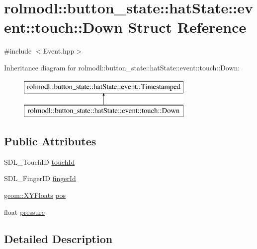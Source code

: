 \hypertarget{structrolmodl_1_1button__state_1_1hat_state_1_1event_1_1touch_1_1_down}{}\section{rolmodl\+::button\+\_\+state\+::hat\+State\+::event\+::touch\+::Down Struct Reference}
\label{structrolmodl_1_1button__state_1_1hat_state_1_1event_1_1touch_1_1_down}


{\ttfamily \#include $<$Event.\+hpp$>$}

Inheritance diagram for rolmodl\+::button\+\_\+state\+::hat\+State\+::event\+::touch\+::Down\+:\begin{figure}[H]
\begin{center}
\leavevmode
\includegraphics[height=2.000000cm]{structrolmodl_1_1button__state_1_1hat_state_1_1event_1_1touch_1_1_down}
\end{center}
\end{figure}
\subsection*{Public Attributes}
\begin{DoxyCompactItemize}
\item 
S\+D\+L\+\_\+\+Touch\+ID \mbox{\hyperlink{structrolmodl_1_1button__state_1_1hat_state_1_1event_1_1touch_1_1_down_a069eceddb6181fac467757a5ae824cd0}{touch\+Id}}
\item 
S\+D\+L\+\_\+\+Finger\+ID \mbox{\hyperlink{structrolmodl_1_1button__state_1_1hat_state_1_1event_1_1touch_1_1_down_a5dac16f57f243b6b2acd5a5437dba399}{finger\+Id}}
\item 
\mbox{\hyperlink{structrolmodl_1_1geom_1_1_x_y_floats}{geom\+::\+X\+Y\+Floats}} \mbox{\hyperlink{structrolmodl_1_1button__state_1_1hat_state_1_1event_1_1touch_1_1_down_a27a8b337739729712dd0e985d347d794}{pos}}
\item 
float \mbox{\hyperlink{structrolmodl_1_1button__state_1_1hat_state_1_1event_1_1touch_1_1_down_ad42c23b8b4d365817c24d5a66774df28}{pressure}}
\end{DoxyCompactItemize}


\subsection{Detailed Description}


